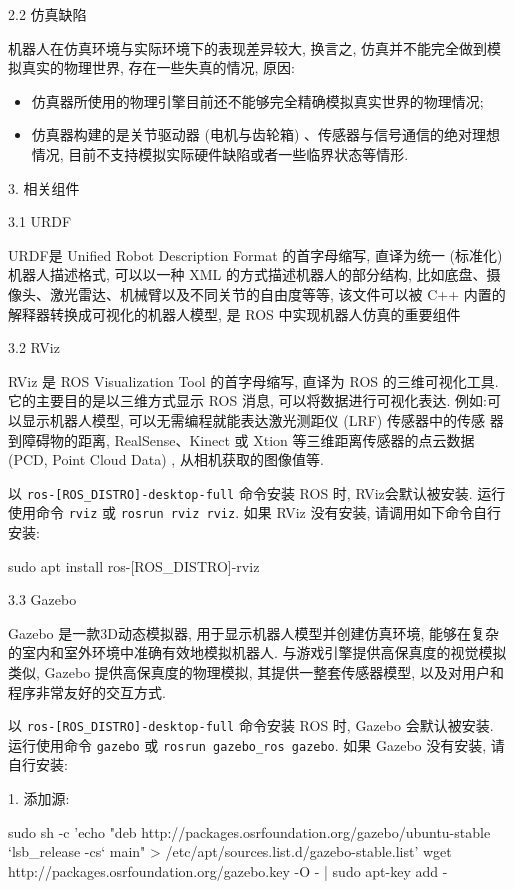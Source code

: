 \documentclass[openany, fontset=windowsold]{ctexbook}
\theoremstyle{kaiti}
\theoremstyle{normal}
\begin{document}
2.2 仿真缺陷

机器人在仿真环境与实际环境下的表现差异较大, 换言之, 仿真并不能完全做到模拟真实的物理世界, 存在一些失真的情况, 原因:

\begin{itemize}
  \item 仿真器所使用的物理引擎目前还不能够完全精确模拟真实世界的物理情况;
  \item 仿真器构建的是关节驱动器 (电机与齿轮箱) 、传感器与信号通信的绝对理想情况, 目前不支持模拟实际硬件缺陷或者一些临界状态等情形.
\end{itemize}

3. 相关组件

3.1 URDF

URDF是 Unified Robot Description Format 的首字母缩写, 直译为统一 (标准化) 机器人描述格式, 可以以一种 XML 的方式描述机器人的部分结构, 比如底盘、摄像头、激光雷达、机械臂以及不同关节的自由度等等, 该文件可以被 C++ 内置的解释器转换成可视化的机器人模型, 是 ROS 中实现机器人仿真的重要组件

3.2 RViz

RViz 是 ROS Visualization Tool 的首字母缩写, 直译为 ROS 的三维可视化工具. 它的主要目的是以三维方式显示 ROS 消息, 可以将数据进行可视化表达. 例如:可以显示机器人模型, 可以无需编程就能表达激光测距仪 (LRF) 传感器中的传感 器到障碍物的距离, RealSense、Kinect 或 Xtion 等三维距离传感器的点云数据 (PCD, Point Cloud Data) , 从相机获取的图像值等.

以 \verb|ros-[ROS_DISTRO]-desktop-full| 命令安装 ROS 时, RViz会默认被安装. 运行使用命令 \verb|rviz| 或 \verb|rosrun rviz rviz|. 如果 RViz 没有安装, 请调用如下命令自行安装:

\begin{bash}
  sudo apt install ros-[ROS_DISTRO]-rviz
\end{bash}

3.3 Gazebo

Gazebo 是一款3D动态模拟器, 用于显示机器人模型并创建仿真环境, 能够在复杂的室内和室外环境中准确有效地模拟机器人. 与游戏引擎提供高保真度的视觉模拟类似, Gazebo 提供高保真度的物理模拟, 其提供一整套传感器模型, 以及对用户和程序非常友好的交互方式.

以 \verb|ros-[ROS_DISTRO]-desktop-full| 命令安装 ROS 时, Gazebo 会默认被安装. 运行使用命令 \verb|gazebo| 或 \verb|rosrun gazebo_ros gazebo|. 如果 Gazebo 没有安装, 请自行安装:

1. 添加源:

\begin{bash}
  sudo sh -c 'echo "deb http://packages.osrfoundation.org/gazebo/ubuntu-stable `lsb_release -cs` main" > /etc/apt/sources.list.d/gazebo-stable.list'
  wget http://packages.osrfoundation.org/gazebo.key -O - | sudo apt-key add -
\end{bash}
\end{document}
